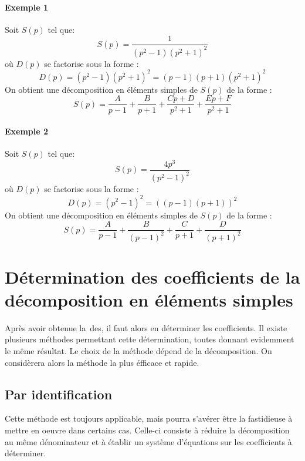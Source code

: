 \paragraph{Exemple 1}
Soit $S(p)$ tel que:
\[
S(p)=\dfrac{1}{(p^2-1)(p^2+1)^2}
\]
où $D(p)$ se factorise sous la forme :
\[
D(p)=(p^2-1)(p^2+1)^2=(p-1)(p+1)(p^2+1)^2
\]
On obtient une décomposition en éléments simples de $S(p)$ de la forme :
\[
S(p)=\dfrac{A}{p-1}+\dfrac{B}{p+1}+\dfrac{Cp+D}{p^2+1}+\dfrac{Ep+F}{p^2+1}
\]

\paragraph{Exemple 2}
Soit $S(p)$ tel que:
\[
S(p)=\dfrac{4p^3}{(p^2-1)^2}
\]
où $D(p)$ se factorise sous la forme :
\[
D(p)=(p^2-1)^2=\left((p-1)(p+1)\right)^2
\]
On obtient une décomposition en éléments simples de $S(p)$ de la forme :
\[
S(p)=\dfrac{A}{p-1}+\dfrac{B}{(p-1)^2}+\dfrac{C}{p+1}+\dfrac{D}{(p+1)^2}
\]
\section[Détermination des coefficients de la DES]
        {Détermination des coefficients de la 
         décomposition en éléments simples}
Après avoir obtenue la~\gls{des}, il faut alors en déterminer les coefficients.
Il existe plusieurs méthodes permettant cette détermination, toutes donnant 
evidemment le même résultat. Le choix de la méthode dépend de la décomposition.
On considèrera alors la méthode la plus éfficace et rapide.

\subsection{Par identification}
Cette méthode est toujours applicable, mais pourra s'avérer être la fastidieuse
à mettre en oeuvre dans certains cas.
Celle-ci consiste à réduire la décomposition au même dénominateur et à établir
un système d'équations sur les coefficients à déterminer.

